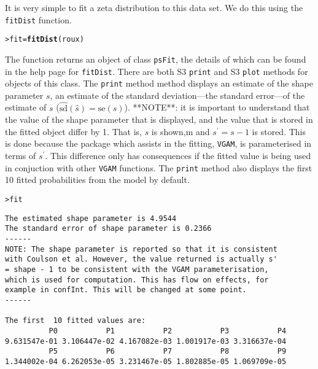 \documentclass{article}\usepackage[]{graphicx}\usepackage[]{xcolor}
\makeatletter
\newcommand{\hlstd}[1]{\textcolor[rgb]{0.345,0.345,0.345}{#1}}%
\newcommand{\hlkwb}[1]{\textcolor[rgb]{0.69,0.353,0.396}{#1}}%
\newcommand{\hlkwd}[1]{\textcolor[rgb]{0.737,0.353,0.396}{\textbf{#1}}}%
\newenvironment{kframe}{%
 \def\at@end@of@kframe{}%
 \ifinner\ifhmode%
  \def\at@end@of@kframe{\end{minipage}}%
  \begin{minipage}{\columnwidth}%
 \fi\fi%
 \def\FrameCommand##1{\hskip\@totalleftmargin \hskip-\fboxsep
 \colorbox{shadecolor}{##1}\hskip-\fboxsep
     \hskip-\linewidth \hskip-\@totalleftmargin \hskip\columnwidth}%
 \MakeFramed {\advance\hsize-\width
   \@totalleftmargin\z@ \linewidth\hsize
   \@setminipage}}%
 {\par\unskip\endMakeFramed%
 \at@end@of@kframe}
\newenvironment{knitrout}{}{} %
\newcommand{\rcode}[1]{\lstinline[language=R,basicstyle=\normalsize\ttfamily]!#1!}
\makeatother
\begin{document}
It is very simple to fit a zeta distribution to this data set. We do this using the \rcode{fitDist} function.
\begin{knitrout}
\color{fgcolor}\begin{kframe}
\begin{alltt}
\hlstd{> }\hlstd{fit} \hlkwb{=} \hlkwd{fitDist}\hlstd{(roux)}
\end{alltt}
\end{kframe}
\end{knitrout}
The function returns an object of class \rcode{psFit}, the details of which can be found in the help page for \rcode{fitDist}. There are both S3 \rcode{print} and S3 \rcode{plot} methods for objects of this class. The \rcode{print} method method displays an estimate of the shape parameter $s$, an estimate of the standard deviation---the standard error---of the estimate of $s$ ($\widehat{\mathrm{sd}}(\hat{s})=\mathrm{se}(\hat{s})$). **NOTE**: it is important to understand that the value of the shape parameter that is displayed, and the value that is stored in the fitted object differ by 1. That is, $s$ is shown,m and $s^\prime = s - 1$ is stored. This is done because the package which assists in the fitting, \rcode{VGAM}, is parameterised in terms of $s^\prime$. This difference only has consequences if the fitted value is being used in conjuction with other \rcode{VGAM} functions.   The \rcode{print} method also displays the first 10 fitted probabilities from the model by default.
\begin{knitrout}
\color{fgcolor}\begin{kframe}
\begin{alltt}
\hlstd{> }\hlstd{fit}
\end{alltt}
\begin{verbatim}
The estimated shape parameter is 4.9544 
The standard error of shape parameter is 0.2366 
------
NOTE: The shape parameter is reported so that it is consistent
with Coulson et al. However, the value returned is actually s'
= shape - 1 to be consistent with the VGAM parameterisation,
which is used for computation. This has flow on effects, for
example in confInt. This will be changed at some point.
------

The first  10 fitted values are:
          P0           P1           P2           P3           P4 
9.631547e-01 3.106447e-02 4.167082e-03 1.001917e-03 3.316637e-04 
          P5           P6           P7           P8           P9 
1.344002e-04 6.262053e-05 3.231467e-05 1.802885e-05 1.069709e-05 
\end{verbatim}
\end{kframe}
\end{knitrout}
\end{document}
